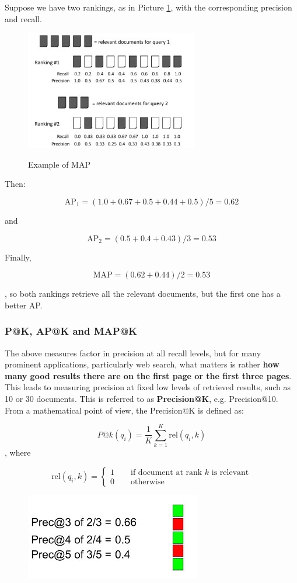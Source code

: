 Suppose we have two rankings, as in Picture \ref{map}, with the corresponding precision and recall.

\begin{figure}[h!]
		\centering
		\includegraphics[scale = 2.0]{img/example MAP.jpg}
		\label{map}
        \caption{Example of MAP}
\end{figure}

Then:

$$
\text{AP}_1 = (1.0 + 0.67 + 0.5 + 0.44 + 0.5)/5 = 0.62
$$

and 

$$
\text{AP}_2 = (0.5 + 0.4 + 0.43)/3 = 0.53
$$

Finally, 

$$
\text{MAP} = (0.62 + 0.44)/2 = 0.53
$$

, so both rankings retrieve all the relevant documents, but the first one has a better AP.

\subsubsection{P@K, AP@K and MAP@K}
The above measures factor in precision at all recall levels, but for many prominent applications, particularly web search, what matters is rather \textbf{how many good results there are on the first page or the first three pages}. This leads to measuring precision at fixed low levels of retrieved results, such as 10 or 30 documents. This is referred to as \textbf{Precision@K}, e.g. Precision@10. From a mathematical point of view, the Precision@K is defined as:

$$
P@k(q_i) = \frac{1}{K} \sum_{k = 1}^K \text{rel}(q_i, k)
$$
, where 

$$
\text{rel}(q_i, k) = \begin{cases}
    1 \qquad \text{if document at rank $k$ is relevant}\\
    0 \qquad \text{otherwise}
\end{cases}
$$

\begin{figure}[h!]
		\centering
		\includegraphics[scale = 2.0]{img/example prec.jpg}
		\label{prec}
\end{figure}

